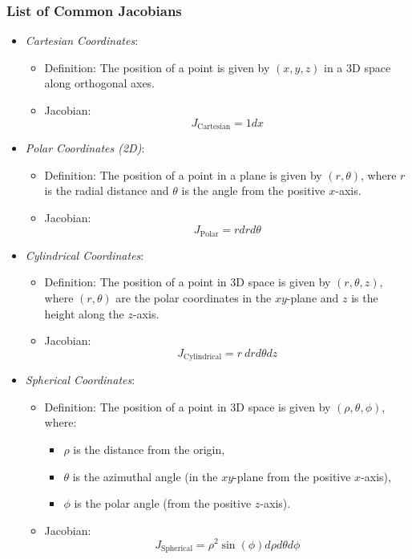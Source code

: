 \subsubsection{List of Common Jacobians}

\begin{itemize}[label=\(-\)]

    \item \emph{Cartesian Coordinates}:
    \begin{itemize}[label=\(-\)]
        \item Definition: The position of a point is given by \((x, y, z)\) in a 3D space along orthogonal axes.
        \item Jacobian: 
        \[
        J_{\text{Cartesian}} = 1dx
        \]
    \end{itemize}

    \item \emph{Polar Coordinates (2D)}:
    \begin{itemize}[label=\(-\)]
        \item Definition: The position of a point in a plane is given by \((r, \theta)\), where \(r\) is the radial distance and \(\theta\) is the angle from the positive \(x\)-axis.
        \item Jacobian:
        \[
        J_{\text{Polar}} = rd rd\theta
        \]
    \end{itemize}

    \item \emph{Cylindrical Coordinates}:
    \begin{itemize}[label=\(-\)]
        \item Definition: The position of a point in 3D space is given by \((r, \theta, z)\), where \((r, \theta)\) are the polar coordinates in the \(xy\)-plane and \(z\) is the height along the \(z\)-axis.
        \item Jacobian:
        \[
        J_{\text{Cylindrical}} = r\ dr d\theta dz
        \]
    \end{itemize}

    \item \emph{Spherical Coordinates}:
    \begin{itemize}[label=\(-\)]
        \item Definition: The position of a point in 3D space is given by \((\rho, \theta, \phi)\), where:
        \begin{itemize}[label=\(-\)]
            \item \(\rho\) is the distance from the origin,
            \item \(\theta\) is the azimuthal angle (in the \(xy\)-plane from the positive \(x\)-axis),
            \item \(\phi\) is the polar angle (from the positive \(z\)-axis).
        \end{itemize}
        \item Jacobian:
        \[
        J_{\text{Spherical}} = \rho^2 \sin (\phi) d\rho d\theta d\phi
        \]
    \end{itemize}

\end{itemize}

